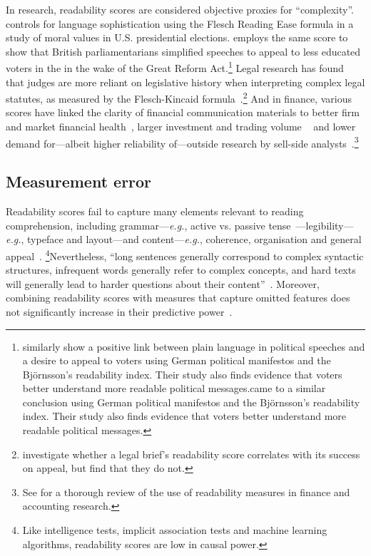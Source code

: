 In research, readability scores are considered objective proxies for ``complexity''.  \citet{Enke2018} controls for language sophistication using the Flesch Reading Ease formula in a study of moral values in U.S. presidential elections.  \citet{Spirling2016} employs the same score to show that British parliamentarians simplified speeches to appeal to less educated voters in the in the wake of the Great Reform Act.\footnote{\citet{Bischof2018} similarly show a positive link between plain language in political speeches and a desire to appeal to voters using German political manifestos and the Björnsson's readability index. Their study also finds evidence that voters better understand more readable political messages.came to a similar conclusion using German political manifestos and the Björnsson's readability index. Their study also finds evidence that voters better understand more readable political messages.} Legal research has found that judges are more reliant on legislative history when interpreting complex legal statutes, as measured by the Flesch-Kincaid formula~\citep{Law2010}.\footnote{\citet{Long2011} investigate whether a legal brief's readability score correlates with its success on appeal, but find that they do not.} And in finance, various scores have linked the clarity of financial communication materials to better firm and market financial health~\citep{Li2008,Biddle2009,Jansen2011}, larger investment and trading volume ~\citep{Miller2010,Thörnqvist2015,DeFranco2015,Lawrence2013} and lower demand for---albeit higher reliability of---outside research by sell-side analysts~\citep{Lehavy2011}.\footnote{See  \citet{Loughran2016} for a thorough review of the use of readability measures in finance and accounting research.} 

\subsection{Measurement error}
\label{calculation}

Readability scores fail to capture many elements relevant to reading comprehension, including grammar---\emph{e.g.}, active vs. passive tense~\citep{Coleman1964,Coleman1965}---legibility---\emph{e.g.}, typeface and layout---and content---\emph{e.g.}, coherence, organisation and general appeal~\citep{Kintsch1984,Kemper1983,Meyer1982,Armbruster1984}. \footnote{Like intelligence tests, implicit association tests and machine learning algorithms, readability scores are low in causal power.}Nevertheless, ``long sentences generally correspond to complex syntactic structures, infrequent words generally refer to complex concepts, and hard texts will generally lead to harder questions about their content''~\citep[][p. 222,]{Kintsch1984}. Moreover, combining readability scores with measures that capture omitted features does not significantly increase in their predictive power~\citep[see, \emph{e.g.},][]{Kemper1983}.


